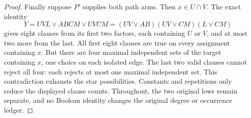 \documentclass[11pt]{article}
\theoremstyle{definition}
\theoremstyle{remark}
\begin{document}
\begin{proof}
Finally suppose $P'$ supplies both path arms. Then $x\in U\cap V$. The exact identity
\[
 Y=UVL\vee ABCM\vee UVCM
   =(UV\vee AB)(UV\vee CM)(L\vee CM)
\]
gives eight clauses from its first two factors, each containing $U$ or $V$, and at most two more from the last. All first eight clauses are true on every assignment containing $x$. But there are four maximal independent sets of the target containing $x$, one choice on each isolated edge. The last two valid clauses cannot reject all four: each rejects at most one maximal independent set. This contradiction exhausts the star possibilities. Constants and repetitions only reduce the displayed clause counts. Throughout, the two original lows remain separate, and no Boolean identity changes the original degree or occurrence ledger.
\end{proof}
\end{document}
